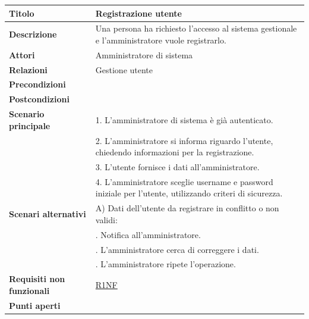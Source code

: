\documentclass[a4paper]{article}
\begin{document}


\begin{center}
\begin{tabularx}{1\textwidth}{|l|X|}
    \hline
	\textbf{Titolo} & Registrazione utente \\
	\hline
	\textbf{Descrizione} & Una persona ha richiesto l'accesso al sistema gestionale e l'amministratore vuole registrarlo. \\
	\hline
	\textbf{Attori} & Amministratore di sistema \\
	\hline
	\textbf{Relazioni} & Gestione utente \\
	\hline
	\textbf{Precondizioni} &  \\
	\hline
	\textbf{Postcondizioni} &  \\
	\hline
	\textbf{Scenario principale} & 1. L'amministratore di sistema è già autenticato.\\
	                             & 2. L'amministratore si informa riguardo l'utente, chiedendo informazioni per la registrazione.\\
								 & 3. L'utente fornisce i dati all'amministratore.\\
								 & 4. L'amministratore sceglie username e password iniziale per l'utente, utilizzando criteri di sicurezza.\\
	\hline
	\textbf{Scenari alternativi} & A) Dati dell'utente da registrare in conflitto o non validi: \\
								 & \quad 1. Notifica all'amministratore.\\
								 & \quad 2. L'amministratore cerca di correggere i dati.\\
								 & \quad 3. L'amministratore ripete l'operazione.\\
	\hline
	\textbf{Requisiti non funzionali} & \hyperlink{R1NF}{R1NF} \\
	\hline
	\textbf{Punti aperti} & \\
	\hline
\end{tabularx}
\end{center}




\end{document}
